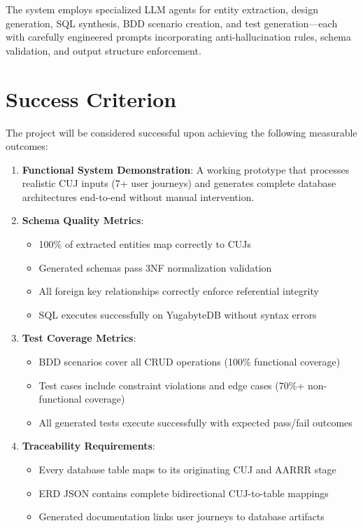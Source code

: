 \documentclass[12pt,a4paper]{article}
\begin{document}
The system employs specialized LLM agents for entity extraction, design generation, SQL synthesis, BDD scenario creation, and test generation—each with carefully engineered prompts incorporating anti-hallucination rules, schema validation, and output structure enforcement.

\section{Success Criterion}

The project will be considered successful upon achieving the following measurable outcomes:

\begin{enumerate}
\item \textbf{Functional System Demonstration}: A working prototype that processes realistic CUJ inputs (7+ user journeys) and generates complete database architectures end-to-end without manual intervention.

\item \textbf{Schema Quality Metrics}:
\begin{itemize}
\item 100\% of extracted entities map correctly to CUJs
\item Generated schemas pass 3NF normalization validation
\item All foreign key relationships correctly enforce referential integrity
\item SQL executes successfully on YugabyteDB without syntax errors
\end{itemize}

\item \textbf{Test Coverage Metrics}:
\begin{itemize}
\item BDD scenarios cover all CRUD operations (100\% functional coverage)
\item Test cases include constraint violations and edge cases (70\%+ non-functional coverage)
\item All generated tests execute successfully with expected pass/fail outcomes
\end{itemize}

\item \textbf{Traceability Requirements}:
\begin{itemize}
\item Every database table maps to its originating CUJ and AARRR stage
\item ERD JSON contains complete bidirectional CUJ-to-table mappings
\item Generated documentation links user journeys to database artifacts
\end{itemize}


\end{enumerate}
\end{document}
